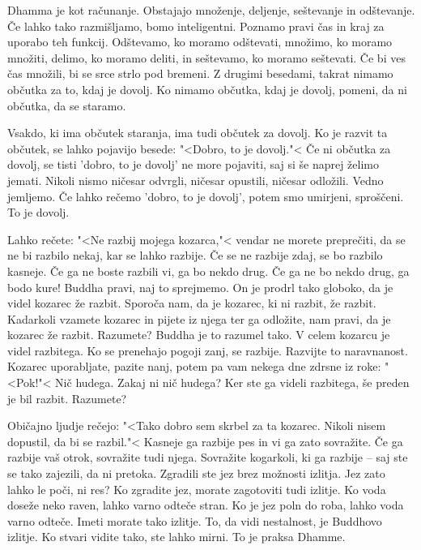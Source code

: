 \clearpage


Dhamma je kot računanje. Obstajajo množenje, deljenje, seštevanje in odštevanje. Če lahko tako razmišljamo, bomo inteligentni. Poznamo pravi čas in kraj za uporabo teh funkcij. Odštevamo, ko moramo odštevati, množimo, ko moramo množiti, delimo, ko moramo deliti, in seštevamo, ko moramo seštevati. Če bi ves čas množili, bi se srce strlo pod bremeni. Z drugimi besedami, takrat nimamo občutka za to, kdaj je dovolj. Ko nimamo občutka, kdaj je dovolj, pomeni, da ni občutka, da se staramo. 

Vsakdo, ki ima občutek staranja, ima tudi občutek za dovolj. Ko je razvit ta občutek, se lahko pojavijo besede: "<Dobro, to je dovolj."< Če ni občutka za dovolj, se tisti 'dobro, to je dovolj' ne more pojaviti, saj si še naprej želimo jemati. Nikoli nismo ničesar odvrgli, ničesar opustili, ničesar odložili. Vedno jemljemo. Če lahko rečemo 'dobro, to je dovolj', potem smo umirjeni, sproščeni. To je dovolj.

\clearpage


Lahko rečete: "<Ne razbij mojega kozarca,"< vendar ne morete preprečiti, da se ne bi razbilo nekaj, kar se lahko razbije. Če se ne razbije zdaj, se bo razbilo kasneje. Če ga ne boste razbili vi, ga bo nekdo drug. Če ga ne bo nekdo drug, ga bodo kure! Buddha pravi, naj to sprejmemo. On je prodrl tako globoko, da je videl kozarec že razbit. Sporoča nam, da je kozarec, ki ni razbit, že razbit. Kadarkoli vzamete kozarec in pijete iz njega ter ga odložite, nam pravi, da je kozarec že razbit. Razumete? Buddha je to razumel tako. V celem kozarcu je videl razbitega. Ko se prenehajo pogoji zanj, se razbije. Razvijte to naravnanost. Kozarec uporabljate, pazite nanj, potem pa vam nekega dne zdrsne iz roke: "<Pok!"< Nič hudega. Zakaj ni nič hudega? Ker ste ga videli razbitega, še preden je bil razbit. Razumete?

Običajno ljudje rečejo: "<Tako dobro sem skrbel za ta kozarec. Nikoli nisem dopustil, da bi se razbil."< Kasneje ga razbije pes in vi ga zato sovražite. Če ga razbije vaš otrok, sovražite tudi njega. Sovražite kogarkoli, ki ga razbije – saj ste se tako zajezili, da ni pretoka. Zgradili ste jez brez možnosti izlitja. Jez zato lahko le poči, ni res? Ko zgradite jez, morate zagotoviti tudi izlitje. Ko voda doseže neko raven, lahko varno odteče stran. Ko je jez poln do roba, lahko voda varno odteče. Imeti morate tako izlitje. To, da vidi nestalnost, je Buddhovo izlitje. Ko stvari vidite tako, ste lahko mirni. To je praksa Dhamme.

